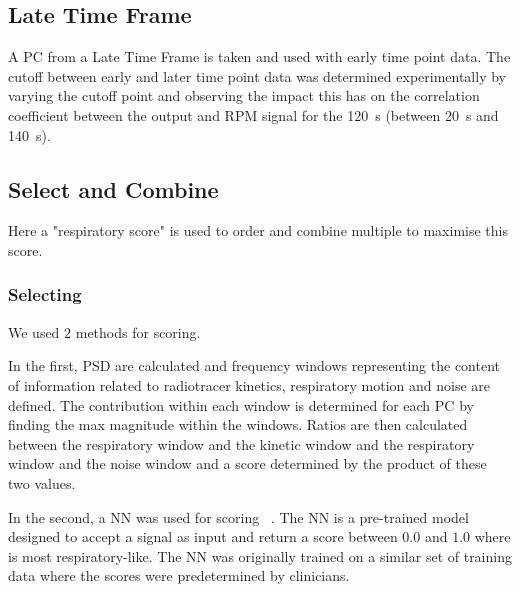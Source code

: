     \vspace{-0.5cm}
            
    \subsection{Late Time Frame} \label{sec:late_time_frame}
        A \gls{PC} from a Late Time Frame is taken and used with early time point data. The cutoff between early and later time point data was determined experimentally by varying the cutoff point and observing the impact this has on the correlation coefficient between the output and \gls{RPM} signal for the \SI{120}{\second} (between \SI{20}{\second} and \SI{140}{\second}).
        
    \vspace{-0.5cm}
    
    \subsection{Select and Combine} \label{sec:select_and_combine}
        Here a "respiratory score" is used to order and combine multiple  to maximise this score.
        
        \subsubsection{Selecting } \label{sec:selecting_pcs}
              We used $2$ methods for scoring.
              
              In the first, \acrlong{PSD} are calculated and frequency windows representing the content of information related to radiotracer kinetics, respiratory motion and noise are defined. The contribution within each window is determined for each \gls{PC} by finding the max magnitude within the windows. Ratios are then calculated between the respiratory window and the kinetic window and the respiratory window and the noise window and a score determined by the product of these two values.
        
        
            In the second, a \gls{NN} was used for scoring ~\cite{Walker2020AutomaticAI}. The \gls{NN} is a pre-trained model designed to accept a signal as input and return a score between $0.0$ and $1.0$ where is most respiratory-like. The \gls{NN} was originally trained on a similar set of training data where the scores were predetermined by clinicians.
        
